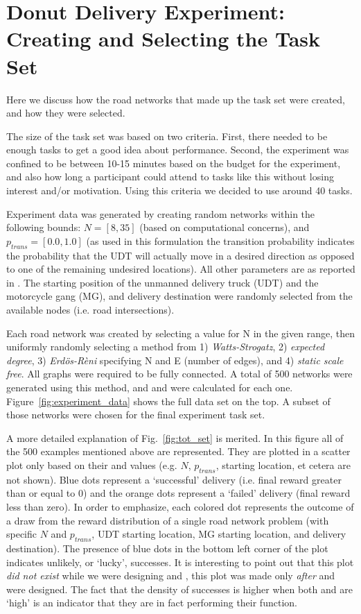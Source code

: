 \section{Donut Delivery Experiment: Creating and Selecting the Task Set}
Here we discuss how the road networks that made up the task set were created, and how they were selected.

The size of the task set was based on two criteria. First, there needed to be enough tasks to get a good idea about performance. Second, the experiment was confined to be between 10-15 minutes based on the budget for the experiment, and also how long a participant could attend to tasks like this without losing interest and/or motivation. Using this criteria we decided to use around 40 tasks.

Experiment data was generated by creating random networks within the following bounds: $N = [8,35]$ (based on computational concerns), and $p_{trans}=[0.0,1.0]$ (as used in this formulation the transition probability indicates the probability that the UDT will actually move in a desired direction as opposed to one of the remaining undesired locations). All other parameters are as reported in \cite{Israelsen2018-qz}. The starting position of the unmanned delivery truck (UDT) and the motorcycle gang (MG), and delivery destination were randomly selected from the available nodes (i.e. road intersections).

Each road network was created by selecting a value for N in the given range, then uniformly randomly selecting a method from 1) \emph{Watts-Strogatz}, 2) \emph{expected degree}, 3) \emph{Erd\"{o}s-R\`{e}ni} specifying N and E (number of edges), and 4) \emph{static scale free}. All graphs were required to be fully connected. A total of 500 networks were generated using this method, and \xQ{} and \xO{} were calculated for each one. Figure~\ref{fig:experiment_data} shows the full data set on the top. A subset of those networks were chosen for the final experiment task set.

A more detailed explanation of Fig.~\ref{fig:tot_set} is merited. In this figure all of the 500 examples mentioned above are represented. They are plotted in a scatter plot only based on their \xQ{} and \xO{} values (e.g. $N$, $p_{trans}$, starting location, et cetera are not shown). Blue dots represent a `successful' delivery (i.e. final reward greater than or equal to 0) and the orange dots represent a `failed' delivery (final reward less than zero). In order to emphasize, each colored dot represents the outcome of a draw from the reward distribution of a single road network problem (with specific $N$ and $p_{trans}$, UDT starting location, MG starting location, and delivery destination). The presence of blue dots in the bottom left corner of the plot indicates unlikely, or `lucky', successes. It is interesting to point out that this plot \emph{did not exist} while we were designing \xQ{} and \xO{}, this plot was made only \emph{after} \xQ{} and \xO{} were designed. The fact that the density of successes is higher when both \xQ{} and \xO{} are `high' is an indicator that they are in fact performing their function.


